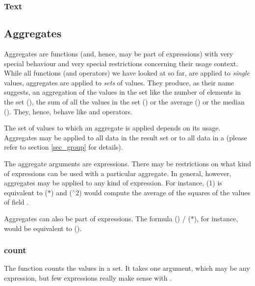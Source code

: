
\comment{
\identifier{year}(\keyword{stamp}) \keyword{between} [2000, 2010[
\keyword{and}
\identifier{month}(\keyword{stamp}) = 6
}

\subsubsection{Text}

\subsection{Aggregates}\label{sec_agg}
Aggregates are functions (and, hence, may be part
of expressions) with very special behaviour and
very special restrictions concerning their usage
context.
While all functions (and operators) we have looked at
so far, are applied to \emph{single} values,
aggregates are applied
to \emph{sets} of values. They produce,
as their name suggests, an aggregation of the
values in the set like the number of elements
in the set (),
the sum of all the values in the set
() or the average ()
or the median ().
They, hence, behave like  and
 operators.

The set of values to which an aggregate is applied
depends on its usage. Aggregates may be applied
to all data in the result set or to all data
in a  (please refer to section \ref{sec_group}
for details).

The aggregate arguments are expressions.
There may be restrictions
on what kind of expressions can be used
with a particular aggregate.
In general, however, aggregates may
be applied to any kind of expression.
For instance,
(1) is equivalent to
($\ast$) and
($^{\wedge}2$) would compute
the average of the squares of the values
of field .

Aggregates can also be part of expressions.
The formula 
()
/ ($\ast$),
for instance, would be equivalent to
().

\subsubsection{count}
The function counts the values in a set.
It takes one argument, which may be any expression,
but few expressions really make sense with .

